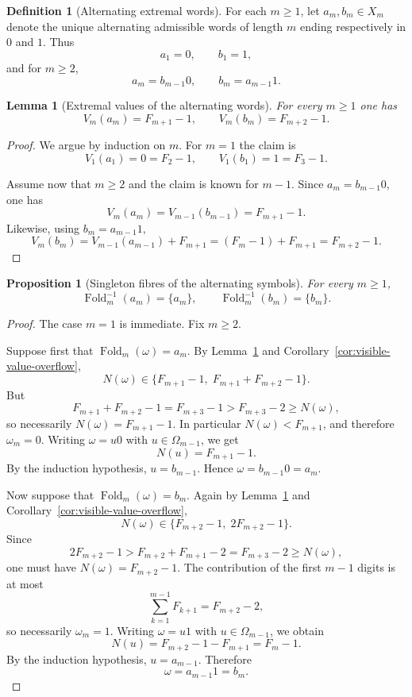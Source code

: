 \documentclass[11pt,letterpaper]{article}
\numberwithin{equation}{section}
\theoremstyle{plain}
\newtheorem{lemma}[theorem]{Lemma}
\newtheorem{proposition}[theorem]{Proposition}
\theoremstyle{definition}
\newtheorem{definition}[theorem]{Definition}
\theoremstyle{remark}
\DeclareMathOperator{\Fold}{Fold}
\begin{document}
\begin{definition}[Alternating extremal words]
\label{def:alternating-extremal-words}
For each $m\ge 1$, let $a_m,b_m\in X_m$ denote the unique alternating
admissible words of length $m$ ending respectively in $0$ and $1$.  Thus
\[
a_1=0,
\qquad
b_1=1,
\]
and for $m\ge 2$,
\[
a_m=b_{m-1}0,
\qquad
b_m=a_{m-1}1.
\]
\end{definition}

\begin{lemma}[Extremal values of the alternating words]
\label{lem:alternating-extremal-values}
For every $m\ge 1$ one has
\[
V_m(a_m)=F_{m+1}-1,
\qquad
V_m(b_m)=F_{m+2}-1.
\]
\end{lemma}

\begin{proof}
We argue by induction on $m$.  For $m=1$ the claim is
\[
V_1(a_1)=0=F_2-1,
\qquad
V_1(b_1)=1=F_3-1.
\]

Assume now that $m\ge 2$ and the claim is known for $m-1$.  Since $a_m=b_{m-1}0$,
one has
\[
V_m(a_m)=V_{m-1}(b_{m-1})=F_{m+1}-1.
\]
Likewise, using $b_m=a_{m-1}1$,
\[
V_m(b_m)=V_{m-1}(a_{m-1})+F_{m+1}
=(F_m-1)+F_{m+1}
=F_{m+2}-1.
\]
\end{proof}

\begin{proposition}[Singleton fibres of the alternating symbols]
\label{prop:alternating-singleton-fibres}
For every $m\ge 1$,
\[
\Fold_m^{-1}(a_m)=\{a_m\},
\qquad
\Fold_m^{-1}(b_m)=\{b_m\}.
\]
\end{proposition}

\begin{proof}
The case $m=1$ is immediate.  Fix $m\ge 2$.

Suppose first that $\Fold_m(\omega)=a_m$.  By
Lemma~\ref{lem:alternating-extremal-values} and
Corollary~\ref{cor:visible-value-overflow},
\[
N(\omega)\in\{F_{m+1}-1,\;F_{m+1}+F_{m+2}-1\}.
\]
But
\[
F_{m+1}+F_{m+2}-1=F_{m+3}-1>F_{m+3}-2\ge N(\omega),
\]
so necessarily $N(\omega)=F_{m+1}-1$.  In particular $N(\omega)<F_{m+1}$, and
therefore $\omega_m=0$.  Writing $\omega=u0$ with $u\in\Omega_{m-1}$, we get
\[
N(u)=F_{m+1}-1.
\]
By the induction hypothesis, $u=b_{m-1}$.  Hence $\omega=b_{m-1}0=a_m$.

Now suppose that $\Fold_m(\omega)=b_m$.  Again by
Lemma~\ref{lem:alternating-extremal-values} and
Corollary~\ref{cor:visible-value-overflow},
\[
N(\omega)\in\{F_{m+2}-1,\;2F_{m+2}-1\}.
\]
Since
\[
2F_{m+2}-1
>
F_{m+2}+F_{m+1}-2
=
F_{m+3}-2
\ge
N(\omega),
\]
one must have $N(\omega)=F_{m+2}-1$.  The contribution of the first $m-1$
digits is at most
\[
\sum_{k=1}^{m-1}F_{k+1}=F_{m+2}-2,
\]
so necessarily $\omega_m=1$.  Writing $\omega=u1$ with $u\in\Omega_{m-1}$, we
obtain
\[
N(u)=F_{m+2}-1-F_{m+1}=F_m-1.
\]
By the induction hypothesis, $u=a_{m-1}$.  Therefore
\[
\omega=a_{m-1}1=b_m.
\]
\end{proof}
\end{document}
